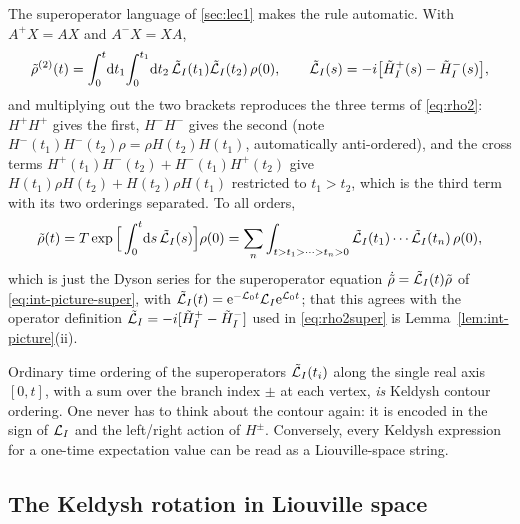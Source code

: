 The superoperator language of \cref{sec:lec1} makes the rule automatic.
With $A^{+}X=AX$ and $A^{-}X=XA$,
\begin{equation}
  \tilde\rho^{(2)}(t)=\int_0^t\!\mathrm{d} t_1\!\int_0^{t_1}\!\mathrm{d} t_2\,
  \tilde{\mathcal{L}}_I(t_1)\tilde{\mathcal{L}}_I(t_2)\,\rho(0),\qquad
  \tilde{\mathcal{L}}_I(s)=-i\big[\tilde H_I^{+}(s)-\tilde H_I^{-}(s)\big],
  \label{eq:rho2super}
\end{equation}
and multiplying out the two brackets reproduces the three terms of \cref{eq:rho2}: $H^+H^+$ gives the first, $H^-H^-$ gives the second (note $H^-(t_1)H^-(t_2)\rho=\rho H(t_2)H(t_1)$, automatically anti-ordered), and the cross terms $H^+(t_1)H^-(t_2)+H^-(t_1)H^+(t_2)$ give $H(t_1)\rho H(t_2)+H(t_2)\rho H(t_1)$ restricted to $t_1>t_2$, which is the third term with its two orderings separated.
To all orders,
\begin{equation}
  \tilde\rho(t)=T\exp\Big[\int_0^t\!\mathrm{d} s\,\tilde{\mathcal{L}}_I(s)\Big]\rho(0)
  =\sum_n\int_{t>t_1>\dots>t_n>0}\tilde{\mathcal{L}}_I(t_1)\cdots\tilde{\mathcal{L}}_I(t_n)\,\rho(0),
  \label{eq:dyson-super}
\end{equation}
which is just the Dyson series for the superoperator equation $\dot{\tilde\rho}=\tilde{\mathcal{L}}_I(t)\tilde\rho$ of \cref{eq:int-picture-super}, with $\tilde{\mathcal{L}}_I(t)=\mathrm{e}^{-\mathcal{L}_0t}\mathcal{L}_I\mathrm{e}^{\mathcal{L}_0t}$; that this agrees with the operator definition $\tilde{\mathcal{L}}_I=-i[\tilde H_I^+-\tilde H_I^-]$ used in \cref{eq:rho2super} is Lemma~\ref{lem:int-picture}(ii).

\begin{keybox}
Ordinary time ordering of the superoperators $\tilde{\mathcal{L}}_I(t_i)$ along the single real axis $[0,t]$, with a sum over the branch index $\pm$ at each vertex, \emph{is} Keldysh contour ordering.
One never has to think about the contour again: it is encoded in the sign of $\mathcal{L}_I$ and the left/right action of $H^\pm$.
Conversely, every Keldysh expression for a one-time expectation value can be read as a Liouville-space string.
\end{keybox}

\subsection{The Keldysh rotation in Liouville space}
\label{sec:rotation-liouville}

